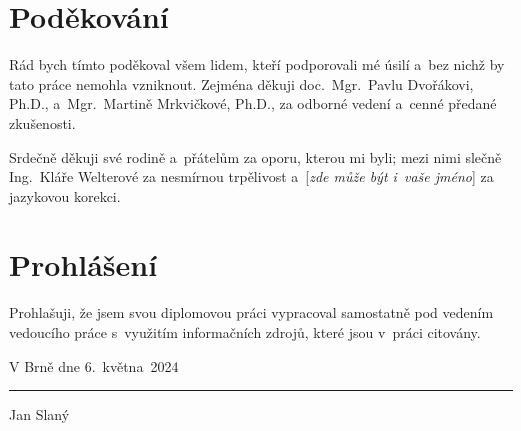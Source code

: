 \cleardoublepage


\chapter*{Poděkování}
Rád bych tímto poděkoval všem lidem, kteří podporovali mé úsilí
a~bez nichž by tato práce nemohla vzniknout.
Zejména děkuji doc.~Mgr.~Pavlu Dvořákovi, Ph.D.,
a~Mgr.~Martině Mrkvičkové, Ph.D.,
za odborné vedení a~cenné předané zkušenosti.

Srdečně děkuji své rodině a~přátelům za oporu, kterou mi byli;
mezi nimi slečně Ing.~Kláře Welterové za nesmírnou trpělivost
a~[\emph{zde může být i~vaše jméno}] za jazykovou korekci.
\vfill

{\let\clearpage\relax\chapter*{Prohlášení}}
\thispagestyle{empty}
Prohlašuji, že jsem svou diplomovou práci vypracoval samostatně
pod vedením vedoucího práce s~využitím informačních zdrojů,
které jsou v~práci citovány.
\bigskip

\noindent
V Brně dne 6.~května~2024
\hfill
\parbox{6cm}{
	\centering
	\vspace{1.5cm}
	\rule{6cm}{0.1pt}\par
	Jan Slaný
}
